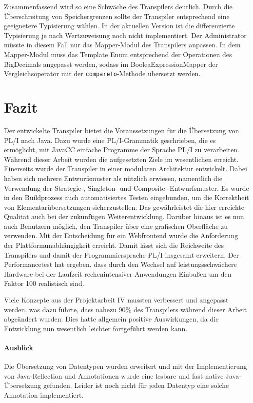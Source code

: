 Zusammenfassend wird so eine Schwäche des Transpilers deutlich. Durch die Überschreitung von Speichergrenzen sollte der Transpiler entsprechend eine geeignetere Typisierung wählen. In der aktuellen Version ist die differenzierte Typisierung je nach Wertzuweisung noch nicht implementiert. Der Administrator müsste in diesem Fall nur das Mapper-Modul des Transpilers anpassen. In dem Mapper-Modul muss das Template Enum entsprechend der Operationen des BigDecimals angepasst werden, sodass im BooleaExpressionMapper der Vergleichsoperator mit der \verb+compareTo+-Methode übersetzt werden.
\pagebreak

\section{Fazit}
Der entwickelte Transpiler bietet die Voraussetzungen für die Übersetzung von PL/I nach Java. Dazu wurde eine PL/I-Grammatik geschrieben, die es ermöglicht, mit JavaCC einfache Programme der Sprache PL/I zu verarbeiten. Während dieser Arbeit wurden die aufgesetzten Ziele im wesentlichen erreicht. 
Einerseits wurde der Transpiler in einer modularen Architektur entwickelt. Dabei haben sich mehrere Entwurfsmuster als nützlich erwiesen,
namentlich die Verwendung der Strategie-, Singleton- und Composite- Entwurfsmuster.
Es wurde in den Buildprozess auch automatisiertes Testen eingebunden, um die Korrektheit von Elementarübersetzungen sicherzustellen. Das gewährleistet die hier erreichte Qualität auch bei der zukünftigen Weiterentwicklung.
Darüber hinaus ist es nun auch Benutzern möglich, den Transpiler über eine grafischen Oberfläche zu verwenden.
Mit der Entscheidung für ein Webfrontend wurde die Anforderung der Plattformunabhängigkeit erreicht. Damit lässt sich die Reichweite des Transpilers und damit der Programmiersprache PL/I insgesamt erweitern.
Der Performancetest hat ergeben, dass durch den Wechsel auf leistungsschwächere Hardware bei der Laufzeit rechenintensiver Anwendungen Einbußen um den Faktor 100 realistisch sind.

Viele Konzepte aus der Projektarbeit IV mussten verbessert und angepasst werden, was dazu führte, dass nahezu 90\% des Transpilers
während dieser Arbeit abgeändert wurden. Dies hatte allgemein positive Auswirkungen, da die Entwicklung nun wesentlich leichter fortgeführt werden kann.

\paragraph*{Ausblick} Die Übersetzung von Datentypen wurden erweitert und mit der Implementierung von Java-Reflection und Annotationen wurde eine lesbare und fast native Java-Übersetzung gefunden. Leider ist noch nicht für jeden Datentyp eine solche Annotation implementiert. 

